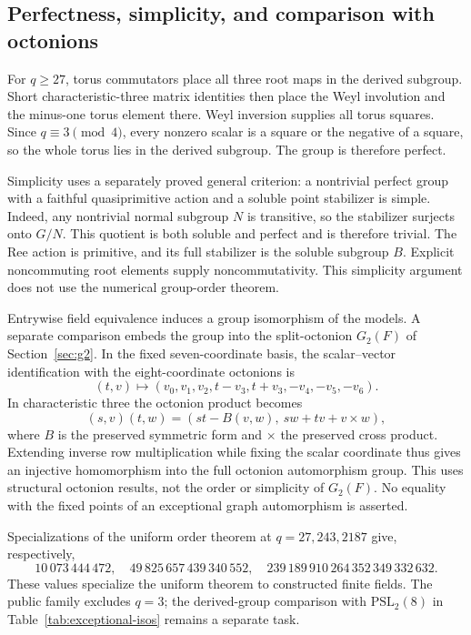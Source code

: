 \documentclass[11pt]{article}
\numberwithin{equation}{section}
\theoremstyle{definition}
\newcommand{\PSL}{\mathrm{PSL}}
\begin{document}
\subsection{Perfectness, simplicity, and comparison with octonions}

For $q\geq27$, torus commutators place all three root maps in the
derived subgroup. Short characteristic-three matrix identities then
place the Weyl involution and the minus-one torus element there.
Weyl inversion supplies all torus squares. Since $q\equiv3\pmod4$,
every nonzero scalar is a square or the negative of a square, so the
whole torus lies in the derived subgroup. The group is therefore perfect.

Simplicity uses a separately proved general criterion: a nontrivial
perfect group with a faithful quasiprimitive action and a soluble point
stabilizer is simple. Indeed, any nontrivial normal subgroup $N$ is
transitive, so the stabilizer surjects onto $G/N$. This quotient is both
soluble and perfect and is therefore trivial. The Ree action is
primitive, and its full stabilizer is the soluble subgroup $B$.
Explicit noncommuting root elements supply noncommutativity. This
simplicity argument does not use the numerical group-order theorem.

Entrywise field equivalence induces a group isomorphism of
the models. A separate comparison embeds the group into the
split-octonion $G_2(F)$ of Section~\ref{sec:g2}. In the fixed
seven-coordinate basis, the scalar--vector identification with the
eight-coordinate octonions is
\[
 (t,v)\longmapsto
 (v_0,v_1,v_2,t-v_3,t+v_3,-v_4,-v_5,-v_6).
\]
In characteristic three the octonion product becomes
\[
 (s,v)(t,w)=(st-B(v,w),\ sw+tv+v\mathbin{\times}w),
\]
where $B$ is the preserved symmetric form and $\times$ the preserved
cross product. Extending inverse row multiplication while fixing the
scalar coordinate thus gives an injective homomorphism into the full
octonion automorphism group. This uses structural octonion results,
not the order or simplicity of $G_2(F)$. No equality with the fixed
points of an exceptional graph automorphism is asserted.

Specializations of the uniform order theorem at $q=27,243,2187$
give, respectively,
\[
10\,073\,444\,472,\quad
49\,825\,657\,439\,340\,552,\quad
239\,189\,910\,264\,352\,349\,332\,632.
\]
These values specialize the uniform theorem to constructed finite fields. The public family excludes
$q=3$; the derived-group comparison with $\PSL_2(8)$ in
Table~\ref{tab:exceptional-isos} remains a separate task.
\end{document}
